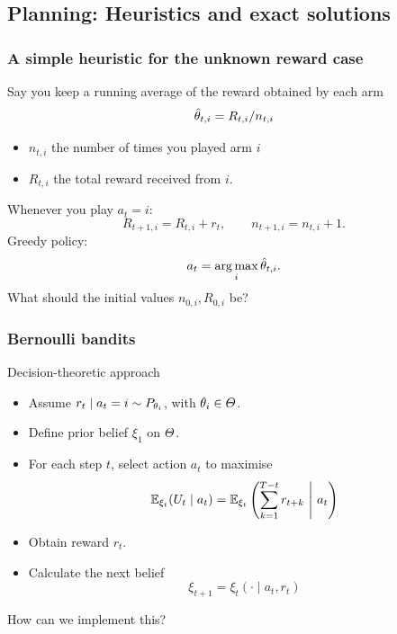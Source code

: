 \documentclass[9pt]{beamer}
\begin{document}
\subsection{Planning: Heuristics and exact solutions}
\label{sec:exp-design-bandit}


\begin{frame}
  \frametitle{A simple heuristic for the unknown reward case}
  Say you keep a \alert{running average} of the reward obtained by each arm
  \[
  \hat{\theta}_{t,i} = R_{t,i} / n_{t,i}
  \]
  \begin{itemize}
  \item $n_{t,i}$ the number of times you played arm $i$ 
  \item $R_{t,i}$ the total reward received from $i$.
  \end{itemize}
  Whenever you play $a_t = i$:
  \[
  R_{t+1, i} = R_{t,i} + r_t, \qquad n_{t+1,i} = n_{t,i} + 1.
  \]
  Greedy policy:
  \[
  a_t = \mathop{\rm arg\,max}_i \hat{\theta}_{t,i}.
  \]
  What should the initial values $n_{0,i}, R_{0,i}$ be?
\end{frame}


\begin{frame}
  \frametitle{Bernoulli bandits}
  \begin{block}{Decision-theoretic approach}
    \begin{itemize}
    \item Assume $r_t \mid a_t = i \sim P_{\theta_i}$, with $\theta_i\in \Theta$.
    \item Define prior belief  $\xi_1$ on $\Theta$.
    \item For each step $t$, select action $a_t$ to maximise 
      \[
        \mathop{\mbox{\ensuremath{\mathbb{E}}}}\nolimits_{\xi_t}( U_t  \mid a_t) = \mathop{\mbox{\ensuremath{\mathbb{E}}}}\nolimits_{\xi_t} \left(\sum_{k=1}^{T-t}  r_{t+k} ~\middle|~ a_t \right)
      \]
    \item Obtain reward $r_t$.
    \item Calculate the next belief
      \[
        \xi_{t+1} = \xi_t(\cdot \mid a_t, r_t)
      \]
    \end{itemize}
  \end{block}
  How can we implement this?
\end{frame}
\end{document}
